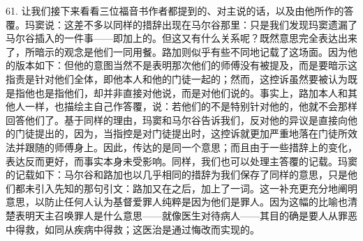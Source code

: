 61. 让我们接下来看看三位福音书作者都提到的、对主说的话，以及由他所作的答覆。玛窦说：这差不多以同样的措辞出现在马尔谷那里：只是我们发现玛窦遗漏了马尔谷插入的一件事——即加上的。但这又有什么关系呢？既然意思完全表达出来了，所暗示的观念是他们一同用餐。路加则似乎有些不同地记载了这场面。因为他的版本如下：但他的意图当然不是表明那次他们的师傅没有被提及，而是要暗示这指责是针对他们全体，即他本人和他的门徒一起的；然而，这控诉虽然要被认为既是指他也是指他们，却并非直接对他说，而是对他们说的。事实上，路加本人和其他人一样，也描绘主自己作答覆，说：若他们的不是特别针对他的，他就不会那样回答他们了。基于同样的理由，玛窦和马尔谷告诉我们，反对他的异议是直接向他的门徒提出的，因为，当指控是对门徒提出时，这控诉就更加严重地落在门徒所效法并跟随的师傅身上。因此，传达的是同一个意思；而且由于一些措辞上的变化，表达反而更好，而事实本身未受影响。同样，我们也可以处理主答覆的记载。玛窦的记载如下：马尔谷和路加也以几乎相同的措辞为我们保存了同样的意思，只是他们都未引入先知的那句引文：路加又在之后，加上了一词。这一补充更充分地阐明意思，以防止任何人认为基督爱罪人纯粹是因为他们是罪人。因为这幅的比喻也清楚表明天主召唤罪人是什么意思——就像医生对待病人——其目的确是要人从罪恶中得救，如同从疾病中得救；这医治是通过悔改而实现的。\par

